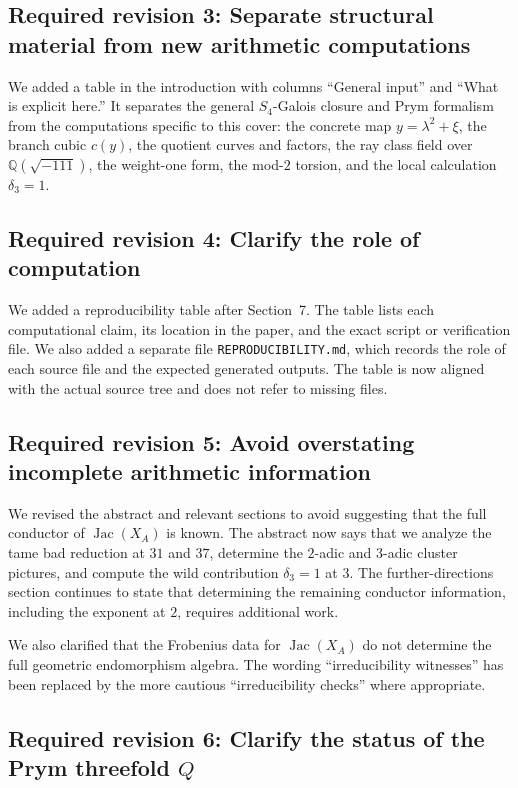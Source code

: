 \documentclass[11pt,letterpaper]{article}
\newcommand{\QQ}{\mathbb{Q}}
\newcommand{\Jac}{\operatorname{Jac}}
\begin{document}
\subsection*{Required revision 3: Separate structural material from new arithmetic computations}

We added a table in the introduction with columns ``General input'' and ``What is explicit here.'' It separates the general \(S_4\)-Galois closure and Prym formalism from the computations specific to this cover: the concrete map \(y=\lambda^2+\xi\), the branch cubic \(c(y)\), the quotient curves and factors, the ray class field over \(\QQ(\sqrt{-111})\), the weight-one form, the mod-\(2\) torsion, and the local calculation \(\delta_3=1\).

\subsection*{Required revision 4: Clarify the role of computation}

We added a reproducibility table after Section~7. The table lists each computational claim, its location in the paper, and the exact script or verification file. We also added a separate file \texttt{REPRODUCIBILITY.md}, which records the role of each source file and the expected generated outputs. The table is now aligned with the actual source tree and does not refer to missing files.

\subsection*{Required revision 5: Avoid overstating incomplete arithmetic information}

We revised the abstract and relevant sections to avoid suggesting that the full conductor of \(\Jac(X_A)\) is known. The abstract now says that we analyze the tame bad reduction at \(31\) and \(37\), determine the \(2\)-adic and \(3\)-adic cluster pictures, and compute the wild contribution \(\delta_3=1\) at \(3\). The further-directions section continues to state that determining the remaining conductor information, including the exponent at \(2\), requires additional work.

We also clarified that the Frobenius data for \(\Jac(X_A)\) do not determine the full geometric endomorphism algebra. The wording ``irreducibility witnesses'' has been replaced by the more cautious ``irreducibility checks'' where appropriate.

\subsection*{Required revision 6: Clarify the status of the Prym threefold \(Q\)}
\end{document}
